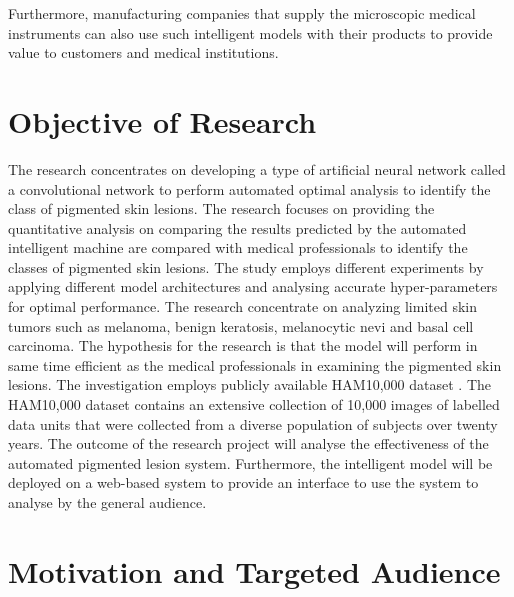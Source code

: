 Furthermore, manufacturing companies that supply the microscopic medical instruments can also use such intelligent models with their products to provide value to customers and medical institutions.

\section{Objective of Research}
The research concentrates on developing a type of artificial neural network called a convolutional network to perform automated optimal analysis to identify the class of pigmented skin lesions. 
The research focuses on providing the quantitative analysis on comparing the results predicted by the automated intelligent machine are compared with medical professionals to identify the classes of pigmented skin lesions. The study employs different experiments by applying different model architectures and analysing accurate hyper-parameters for optimal performance. 
The research concentrate on analyzing limited skin tumors such as melanoma, 
benign keratosis, melanocytic nevi and basal cell carcinoma. The hypothesis for the research is that the model will perform 
in same time efficient as the medical professionals in examining the pigmented skin lesions. The investigation employs publicly available HAM10,000 dataset \citep{DVN/DBW86T_2018}. 
The HAM10,000 dataset contains an extensive collection of 10,000 images of labelled data units that were collected from a diverse population of subjects over twenty years.
The outcome of the research project will analyse the effectiveness of the automated pigmented 
lesion system. Furthermore, the intelligent model will be deployed on a web-based system to provide an interface to use the system to analyse by the general audience.
\pagebreak

\section{Motivation and Targeted Audience}


